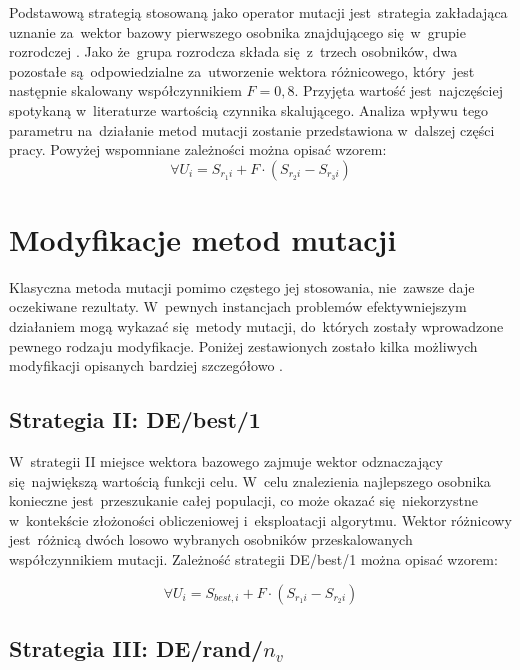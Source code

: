 Podstawową strategią stosowaną jako operator mutacji jest~strategia zakładająca uznanie za~wektor bazowy pierwszego osobnika znajdującego się~w~grupie rozrodczej \cite{diff2}. Jako że~grupa rozrodcza składa się~z~trzech osobników, dwa pozostałe są~odpowiedzialne za~utworzenie wektora różnicowego, który~jest następnie skalowany współczynnikiem $F = 0,8$. Przyjęta wartość jest~najczęściej spotykaną w~literaturze wartością czynnika skalującego. Analiza wpływu tego parametru na~działanie metod mutacji zostanie przedstawiona w~dalszej części pracy. Powyżej wspomniane zależności można opisać wzorem:
\begin{equation}
\label{firatmutate}
 \forall U_{i} =S_{r_{1}i} + F \cdot (S_{r_{2}i} - S_{r_{3}i})
\end{equation}
\section{Modyfikacje metod mutacji}\label{sec:kompilacja}

Klasyczna metoda mutacji pomimo częstego jej stosowania, nie~zawsze daje oczekiwane rezultaty. W~pewnych instancjach problemów efektywniejszym działaniem mogą wykazać się~metody mutacji, do~których zostały wprowadzone pewnego rodzaju modyfikacje. Poniżej zestawionych zostało kilka możliwych modyfikacji opisanych bardziej szczegółowo \cite{diff2}.

\subsection{Strategia II: DE/best/1}\label{sec:kompilacja}

W~strategii II miejsce wektora bazowego zajmuje wektor odznaczający się~największą wartością funkcji celu. W~celu znalezienia najlepszego osobnika konieczne jest~przeszukanie całej populacji, co może okazać się~niekorzystne w~kontekście złożoności obliczeniowej i~eksploatacji algorytmu. Wektor różnicowy jest~różnicą dwóch losowo wybranych osobników przeskalowanych współczynnikiem mutacji. Zależność strategii DE/best/1 można opisać wzorem:

\begin{equation}
 \forall U_{i} =S_{best,i} + F \cdot (S_{r_{1}i} - S_{r_{2}i})
\end{equation}

\subsection{Strategia III: DE/rand/$n_{v}$}\label{sec:narzedzia}

